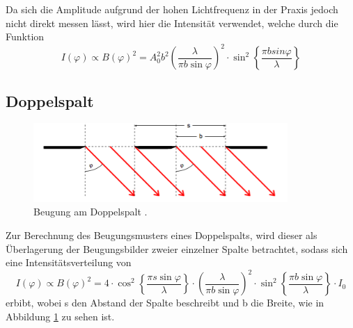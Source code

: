 Da sich die Amplitude aufgrund der hohen Lichtfrequenz in der Praxis jedoch nicht direkt messen lässt, wird hier
die Intensität verwendet, welche durch die Funktion
\begin{equation}
  I(\varphi) \propto B(\varphi)^2 = A_0^2b^2\left(\frac{\lambda}{\pi b \sin{\varphi}}\right)^2
  \cdot \sin^2\left\{{\frac{\pi b sin{\varphi}}{\lambda}}\right\}
  \label{eqn:int1}
\end{equation}
\subsection{Doppelspalt}
\begin{figure}[H]
  \centering
  \includegraphics[height=3cm]{Doppel.png}
  \caption{Beugung am Doppelspalt \cite{skript}.}
  \label{fig:doppel}
\end{figure}
Zur Berechnung des Beugungsmusters eines Doppelspalts, wird dieser als
Überlagerung der Beugungsbilder zweier einzelner Spalte betrachtet, sodass
sich eine Intensitätsverteilung von
\begin{equation}
  I(\varphi) \propto B(\varphi)^2 =4 \cdot \cos^2\left\{{\frac{\pi s \sin{\varphi}}{\lambda}}\right\}
  \cdot \left(\frac{\lambda}{\pi b \sin{\varphi}}\right)^2 \cdot \sin^2\left\{{\frac{\pi
  b \sin{\varphi}}{\lambda}}\right\} \cdot I_0
  \label{doppelinf}
\end{equation}
erbibt, wobei s den Abstand der Spalte beschreibt und b die Breite, wie in Abbildung
\ref{fig:doppel} zu sehen ist.
